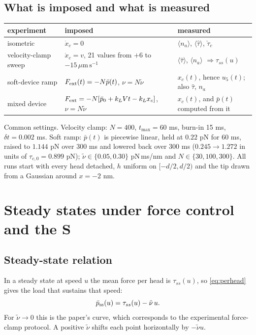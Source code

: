 \documentclass[11pt,a4paper]{article}
\newcommand{\umps}{\,\mu\mathrm{m\,s^{-1}}}
\newcommand{\tauz}{\tau_{c,0}}
\newcommand{\pss}{\bar p_{\rm ss}}
\begin{document}
\subsection{What is imposed and what is measured}
\begin{center}
\begin{tabular}{p{3.3cm}p{5.2cm}p{5.5cm}}
\toprule
experiment & imposed & measured \\
\midrule
isometric & $\dot x_c=0$ & $\langle n_a\rangle$, $\langle\hat\tau\rangle$, $\check\tau_c$ \\
velocity-clamp sweep & $\dot x_c=v$, 21 values from $+6$ to $-15\umps$ & $\langle\hat\tau\rangle$, $\langle n_a\rangle$ $\Rightarrow\tau_{ss}(u)$ \\
soft-device ramp & $F_{\rm ext}(t)=-N\bar p(t)$, $\nu=N\tilde\nu$ & $x_c(t)$, hence $u_5(t)$; also $\hat\tau$, $n_a$ \\
mixed device & $F_{\rm ext}=-N[\bar p_0+k_LVt-k_Lx_c]$, $\nu=N\tilde\nu$ & $x_c(t)$, and $\bar p(t)$ computed from it \\
\bottomrule
\end{tabular}
\end{center}
Common settings. Velocity clamp: $N=400$, $t_{\max}=60$ ms, burn-in 15 ms, $\delta t=0.002$ ms. Soft ramp: $\bar p(t)$ is piecewise linear, held at $0.22$ pN for 60 ms, raised to $1.144$ pN over 300 ms and lowered back over 300 ms ($0.245\to1.272$ in units of $\tauz=0.899$ pN); $\tilde\nu\in\{0.05,0.30\}$ pN\,ms/nm and $N\in\{30,100,300\}$. All runs start with every head detached, $h$ uniform on $[-d/2,d/2)$ and the tip drawn from a Gaussian around $x=-2$ nm.

\section{Steady states under force control and the S}
\label{sec:steady}

\subsection{Steady-state relation}
In a steady state at speed $u$ the mean force per head is $\tau_{ss}(u)$, so \eqref{eq:perhead} gives the load that sustains that speed:
\begin{equation}
\pss(u)=\tau_{ss}(u)-\tilde\nu\,u .
\label{eq:pbar}
\end{equation}
For $\tilde\nu\to0$ this is the paper's curve, which corresponds to the experimental force-clamp protocol. A positive $\tilde\nu$ shifts each point horizontally by $-\tilde\nu u$.
\end{document}

